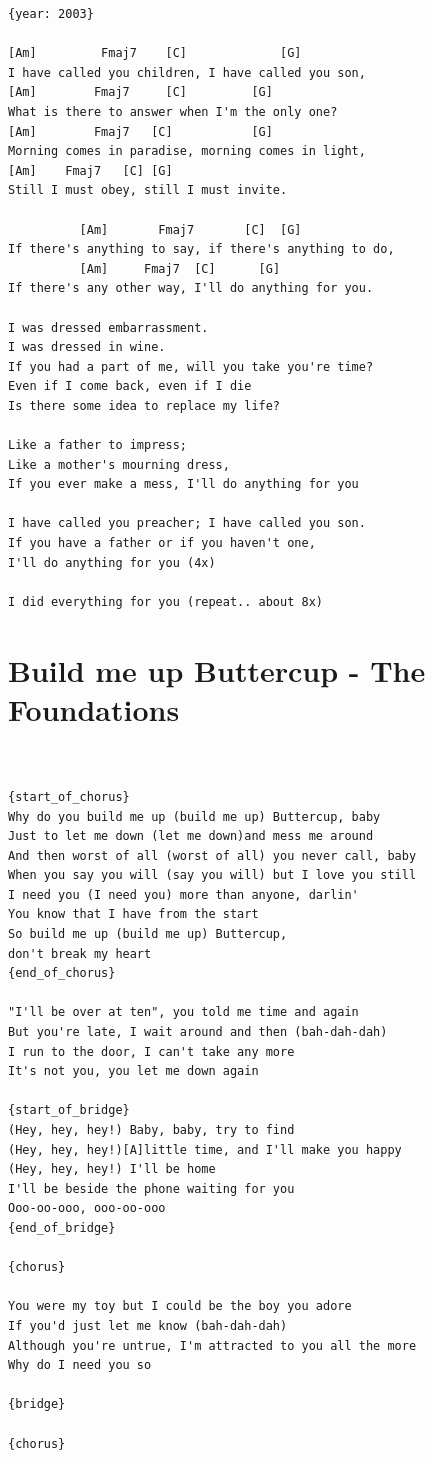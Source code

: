 \documentclass[]{book}
\let\stdsection\section
\renewcommand\section{\clearpage\stdsection}
\begin{document}
\begin{verbatim}
{year: 2003}

[Am]         Fmaj7    [C]             [G]
I have called you children, I have called you son,
[Am]        Fmaj7     [C]         [G]
What is there to answer when I'm the only one?
[Am]        Fmaj7   [C]           [G]
Morning comes in paradise, morning comes in light,
[Am]    Fmaj7   [C] [G]
Still I must obey, still I must invite.

          [Am]       Fmaj7       [C]  [G]
If there's anything to say, if there's anything to do,
          [Am]     Fmaj7  [C]      [G]
If there's any other way, I'll do anything for you.

I was dressed embarrassment. 
I was dressed in wine. 
If you had a part of me, will you take you're time? 
Even if I come back, even if I die 
Is there some idea to replace my life? 

Like a father to impress; 
Like a mother's mourning dress, 
If you ever make a mess, I'll do anything for you 

I have called you preacher; I have called you son. 
If you have a father or if you haven't one, 
I'll do anything for you (4x)

I did everything for you (repeat.. about 8x)
\end{verbatim}

\hypertarget{build-me-up-buttercup---the-foundations}{%
\section{Build me up Buttercup - The Foundations}\label{build-me-up-buttercup---the-foundations}}

\begin{verbatim}


{start_of_chorus}
Why do you build me up (build me up) Buttercup, baby
Just to let me down (let me down)and mess me around
And then worst of all (worst of all) you never call, baby
When you say you will (say you will) but I love you still
I need you (I need you) more than anyone, darlin'
You know that I have from the start
So build me up (build me up) Buttercup, 
don't break my heart
{end_of_chorus}

"I'll be over at ten", you told me time and again
But you're late, I wait around and then (bah-dah-dah)
I run to the door, I can't take any more
It's not you, you let me down again

{start_of_bridge}
(Hey, hey, hey!) Baby, baby, try to find
(Hey, hey, hey!)[A]little time, and I'll make you happy
(Hey, hey, hey!) I'll be home
I'll be beside the phone waiting for you
Ooo-oo-ooo, ooo-oo-ooo
{end_of_bridge}

{chorus}

You were my toy but I could be the boy you adore
If you'd just let me know (bah-dah-dah)
Although you're untrue, I'm attracted to you all the more
Why do I need you so

{bridge}

{chorus}

\end{verbatim}
\end{document}
